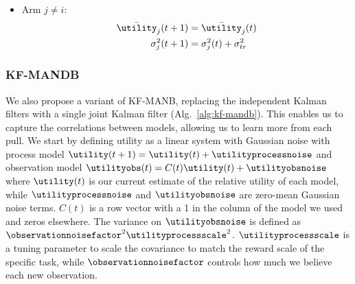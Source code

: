 \begin{algorithm}[t]
\begin{algorithmic}
{\begin{enumerate}
{\begin{itemize}
{                            }
                            \item{Arm $j \neq i$:
                                \begin{align*}
                                    \bar \utility_j(t+1)      &= \bar \utility_j(t) \\
                                    \sigma_j^2(t+1) &= \sigma^2_j(t) + \sigma_{tr}^2
                                \end{align*}
                            }
                        \end{itemize}
                    }
                \end{enumerate}}
        \EndFor
    \end{algorithmic}
\end{algorithm}


\subsubsection{KF-MANDB}
We also propose a variant of KF-MANB, replacing the independent Kalman filters with a single joint Kalman filter (Alg.~\ref{alg:kf-mandb}). This enables us to capture the correlations between models, allowing us to learn more from each pull. We start by defining utility as a linear system with Gaussian noise with process model $\utility(t+1) = \utility(t) + \utilityprocessnoise$ and observation model $\utilityobs(t) = C(t)\utility(t) + \utilityobsnoise$ where $\utility(t)$ is our current estimate of the relative utility of each model, while $\utilityprocessnoise$ and $\utilityobsnoise$ are zero-mean Gaussian noise terms. $C(t)$ is a row vector with a 1 in the column of the model we used and zeros elsewhere. The variance on $\utilityobsnoise$ is defined as $\observationnoisefactor^2 \utilityprocessscale^2$. $\utilityprocessscale$ is a tuning parameter to scale the covariance to match the reward scale of the specific task, while $\observationnoisefactor$ controls how much we believe each new observation.

